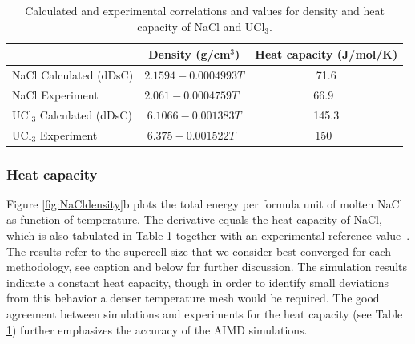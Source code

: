 \documentclass[titlepage=firstiscover,11pt,fleqn,headheight=14pt,footheight=40.8pt]{scrreprt}
\begin{document}

\begin{table}[hb!]
\centering
\begin{tabular}{lcc}
\hline
\hline
& Density (g/cm$^3$) &Heat capacity (J/mol/K) \\
\hline
NaCl Calculated (dDsC)	&$2.1594-0.0004993T$ &71.6 \\
NaCl Experiment	&$2.061-0.0004759T$~\cite{Janz1988} &66.9~\cite{NIST}  \\
UCl$_3$ Calculated (dDsC) &$6.1066-0.001383T$ &145.3 \\	
UCl$_3$ Experiment	&$6.375-0.001522T$~\cite{Desyatnik} &150~\cite{McMurray} \\
\hline
\hline
\end{tabular}
\caption{Calculated and experimental correlations and values for density and heat capacity of NaCl and UCl$_3$.}%
\label{table:NaCldensityetc}
\end{table}

\subsubsection{Heat capacity} 
Figure \ref{fig:NaCldensity}b plots the total energy per formula unit of molten NaCl as function of temperature. The derivative equals the heat capacity of NaCl, which is also tabulated in Table \ref{table:NaCldensityetc} together with an experimental reference value~\cite{NIST}. The results refer to the supercell size that we consider best converged for each methodology, see caption and below for further discussion. The simulation results indicate a constant heat capacity, though in order to identify small deviations from this behavior a denser temperature mesh would be required. The good agreement between simulations and experiments for the heat capacity (see Table \ref{table:NaCldensityetc}) further emphasizes the accuracy of the AIMD simulations. 
\end{document}
